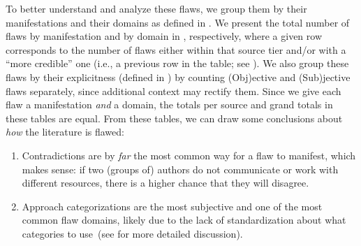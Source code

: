 To better understand and analyze these flaws, we group them by their
manifestations and their domains as defined in .
We present the total number of flaws by manifestation and by domain
in , respectively, where a given
row corresponds to the number of flaws either within that source tier and/or
with a ``more credible'' one (i.e., a previous row in the table; see
). We also group these flaws by their explicitness
(defined in ) by counting (Obj)ective and (Sub)jective flaws
separately, since additional context may rectify them.
Since we give each flaw a manifestation \emph{and} a domain, the totals per
source and grand totals in these tables are equal. From these tables, we can
draw some conclusions about \emph{how} the literature is flawed:
\begin{enumerate}
    \item Contradictions are by \emph{far} the most common way for a flaw to
          manifest, which makes sense: if two (groups of) authors do not
          communicate or work with different resources, there is a higher
          chance that they will disagree.
    \item Approach categorizations are the most subjective and one of the most
          common flaw domains, likely due to the lack of standardization
          about what categories to use\ifnotpaper\ (see 
              for more detailed discussion)\fi.
\end{enumerate}

\ifnotpaper
    

    \begin{landscape}
        \flawMnfstsTable{}
        \flawDmnsTable{}
    \end{landscape}

\fi

